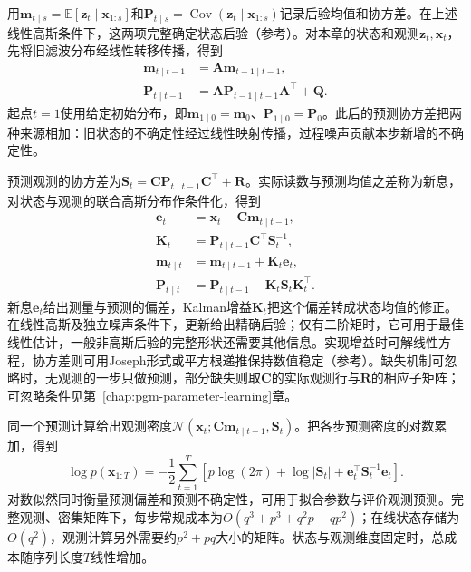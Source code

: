 用$\bm{m}_{t\mid s}=\mathbb{E}[\bm{z}_t\mid\bm{x}_{1:s}]$和$\bm{P}_{t\mid s}=\operatorname{Cov}(\bm{z}_t\mid\bm{x}_{1:s})$记录后验均值和协方差。在上述线性高斯条件下，这两项完整确定状态后验（参考）。对本章的状态和观测$\bm z_t,\bm x_t$，先将旧滤波分布经线性转移传播，得到
\begin{equation}
  \begin{aligned}
    \bm{m}_{t\mid t-1}&=\bm{A}\bm{m}_{t-1\mid t-1},\\
    \bm{P}_{t\mid t-1}
      &=\bm{A}\bm{P}_{t-1\mid t-1}\bm{A}^{\top}
        +\bm{Q}.
  \end{aligned}
  \label{eq:pgm-dynamic-kalman-predict}
\end{equation}
起点$t=1$使用给定初始分布，即$\bm{m}_{1\mid0}=\bm{m}_0$、$\bm{P}_{1\mid0}=\bm{P}_0$。此后的预测协方差把两种来源相加：旧状态的不确定性经过线性映射传播，过程噪声贡献本步新增的不确定性。

预测观测的协方差为$\bm S_t=\bm C\bm P_{t\mid t-1}\bm C^\top+\bm R$。实际读数与预测均值之差称为新息，对状态与观测的联合高斯分布作条件化，得到
\begin{equation}
  \begin{aligned}
    \bm{e}_t&=\bm{x}_t-\bm{C}\bm{m}_{t\mid t-1},\\
    \bm{K}_t&=\bm{P}_{t\mid t-1}\bm{C}^{\top}\bm{S}_t^{-1},\\
    \bm{m}_{t\mid t}
      &=\bm{m}_{t\mid t-1}+\bm{K}_t\bm{e}_t,\\
    \bm{P}_{t\mid t}
      &=\bm{P}_{t\mid t-1}
        -\bm{K}_t\bm{S}_t\bm{K}_t^{\top}.
  \end{aligned}
  \label{eq:pgm-dynamic-kalman-update}
\end{equation}
新息$\bm e_t$给出测量与预测的偏差，Kalman增益$\bm K_t$把这个偏差转成状态均值的修正。在线性高斯及独立噪声条件下，更新给出精确后验；仅有二阶矩时，它可用于最佳线性估计，一般非高斯后验的完整形状还需要其他信息。实现增益时可解线性方程，协方差则可用Joseph形式或平方根递推保持数值稳定（参考）。缺失机制可忽略时，无观测的一步只做预测，部分缺失则取$\bm C$的实际观测行与$\bm R$的相应子矩阵；可忽略条件见第~\ref{chap:pgm-parameter-learning}章。

同一个预测计算给出观测密度$\mathcal N(\bm{x}_t;\bm{C}\bm{m}_{t\mid t-1},\bm{S}_t)$。把各步预测密度的对数累加，得到
\begin{equation}
  \log p(\bm{x}_{1:T})
    =-\frac12\sum_{t=1}^{T}
      \left[
        p\log(2\pi)+\log|\bm{S}_t|
        +\bm{e}_t^\top\bm{S}_t^{-1}\bm{e}_t
      \right].
  \label{eq:pgm-dynamic-kalman-likelihood}
\end{equation}
对数似然同时衡量预测偏差和预测不确定性，可用于拟合参数与评价观测预测。完整观测、密集矩阵下，每步常规成本为$O(q^3+p^3+q^2p+qp^2)$；在线状态存储为$O(q^2)$，观测计算另外需要约$p^2+pq$大小的矩阵。状态与观测维度固定时，总成本随序列长度$T$线性增加。

